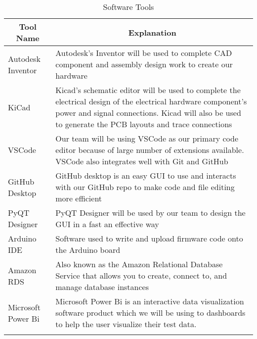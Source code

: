 \documentclass[12pt]{article}
\begin{document}
	\begin{longtable}{|p{6cm}|p{10cm}|}
		\hline
		\multicolumn{1}{|c|}{\textbf{Tool Name}} & \multicolumn{1}{c|}{\textbf{Explanation}} 
		\\ \hline
		Autodesk Inventor
		&  Autodesk's Inventor will be used to complete CAD component and assembly design work to create our hardware  
		\newline                              
		\\ \hline
		KiCad
		& Kicad's schematic editor will be used to complete the electrical design of the electrical hardware component's power and signal connections. Kicad will also be used to generate the PCB layouts and trace connections
		\newline                              
		\\ \hline
		VSCode
		&  Our team will be using VSCode as our primary code editor because of large number of extensions available. VSCode also integrates well with Git and GitHub
		\newline                              
		\\ \hline
		GitHub Desktop
		&  GitHub desktop is an easy GUI to use and interacts with our GitHub repo to make code and file editing more efficient
		\newline                              
		\\ \hline
		PyQT Designer
		&  PyQT Designer will be used by our team to design the GUI in a fast an effective way
		\newline                     
		\\ \hline
		Arduino IDE
		&  Software used to write and upload firmware code onto the Arduino board
		\newline                     
		\\ \hline
		Amazon RDS
		&  Also known as the Amazon Relational Database Service that allows you to create, connect to, and manage database instances
		\newline                     
		\\ \hline
		Microsoft Power Bi
		&  Microsoft Power Bi is an interactive data visualization software product which we will be using to dashboards to help the user visualize their test data.
		\newline                              
		\\ \hline
		\caption{Software Tools}
	\end{longtable}
\end{document}
